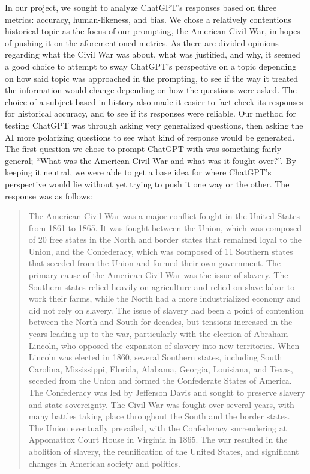 \documentclass[letterpaper, 10pt, conference]{ieeeconf}
\begin{document}
    In our project, we sought to analyze ChatGPT’s responses based on three metrics: accuracy, human-likeness, and bias. We chose a
    relatively contentious historical topic as the focus of our prompting, the American Civil War, in hopes of pushing it on the
    aforementioned metrics. As there are divided opinions regarding what the Civil War was about, what was justified, and why, it
    seemed a good choice to attempt to sway ChatGPT’s perspective on a topic depending on how said topic was approached in the
    prompting, to see if the way it treated the information would change depending on how the questions were asked. The choice of a
    subject based in history also made it easier to fact-check its responses for historical accuracy, and to see if its responses were
    reliable.
    Our method for testing ChatGPT was through asking very generalized questions, then asking the AI more polarizing questions to
    see what kind of response would be generated. The first question we chose to prompt ChatGPT with was something fairly general;
    “What was the American Civil War and what was it fought over?”. By keeping it neutral, we were able to get a base idea for where
    ChatGPT’s perspective would lie without yet trying to push it one way or the other. The response was as follows:
    \begin{quote}
    The American Civil War was a major conflict fought in the United States from 1861 to 1865. It was
    fought between the Union, which was composed of 20 free states in the North and border states
    that remained loyal to the Union, and the Confederacy, which was composed of 11 Southern states
    that seceded from the Union and formed their own government.
    The primary cause of the American Civil War was the issue of slavery. The Southern states relied
    heavily on agriculture and relied on slave labor to work their farms, while the North had a more
    industrialized economy and did not rely on slavery. The issue of slavery had been a point of
    contention between the North and South for decades, but tensions increased in the years leading up
    to the war, particularly with the election of Abraham Lincoln, who opposed the expansion of slavery
    into new territories.
    When Lincoln was elected in 1860, several Southern states, including South Carolina, Mississippi,
    Florida, Alabama, Georgia, Louisiana, and Texas, seceded from the Union and formed the
    Confederate States of America. The Confederacy was led by Jefferson Davis and sought to preserve
    slavery and state sovereignty.
    The Civil War was fought over several years, with many battles taking place throughout the South
    and the border states. The Union eventually prevailed, with the Confederacy surrendering at
    Appomattox Court House in Virginia in 1865. The war resulted in the abolition of slavery, the
    reunification of the United States, and significant changes in American society and politics\cite{navarburnett2023}.
    \end{quote}
\end{document}
